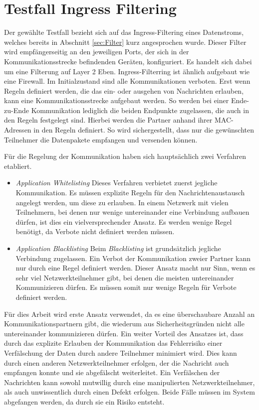\section{Testfall Ingress Filtering}\label{sec:Ingress}
Der gewählte Testfall bezieht sich auf das Ingress-Filtering eines Datenstroms, welches bereits in Abschnitt \ref{sec:Filter} kurz angesprochen wurde. Dieser Filter wird empfängerseitig an den jeweiligen Ports, der sich in der Kommunikationsstrecke befindenden Geräten, konfiguriert. Es handelt sich dabei um eine Filterung auf  Layer 2 Eben. Ingress-Filterring ist ähnlich aufgebaut wie eine Firewall. Im Initialzustand sind alle Kommunikationen verboten. Erst wenn Regeln definiert werden, die das ein- oder ausgehen von Nachrichten erlauben, kann eine Kommunikationsstrecke aufgebaut werden. So werden bei einer Ende-zu-Ende Kommunikation lediglich die beiden Endpunkte zugelassen, die auch in den Regeln festgelegt sind. Hierbei werden die Partner anhand ihrer \ac{MAC}-Adressen in den Regeln definiert. So wird sichergestellt, dass nur die gewünschten Teilnehmer die Datenpakete empfangen und versenden können. 

Für die Regelung der Kommunikation haben sich hauptsächlich zwei Verfahren etabliert. 
\begin{itemize}
	\item \emph{Application Whitelisting}
	\newline Dieses Verfahren verbietet zuerst jegliche Kommunikation. Es müssen explizite Regeln für den Nachrichtenaustausch angelegt werden, um diese zu erlauben. In einem Netzwerk mit vielen Teilnehmern, bei denen nur wenige untereinander eine Verbindung aufbauen dürfen, ist dies ein vielversprechender Ansatz. Es werden wenige Regel benötigt, da Verbote nicht definiert werden müssen.
		
	\item \emph{Application Blacklisting}
	\newline Beim \emph{Blacklisting} ist grundsätzlich jegliche Verbindung zugelassen. Ein Verbot der Kommunikation zweier Partner kann nur durch eine Regel definiert werden. Dieser Ansatz macht nur Sinn, wenn es sehr viel Netzwerkteilnehmer gibt, bei denen die meisten untereinander Kommunizieren dürfen. Es müssen somit nur wenige Regeln für Verbote definiert werden.
\end{itemize}

\newpage

Für dies Arbeit wird erste Ansatz verwendet, da es eine überschaubare Anzahl an Kommunikationspartnern gibt, die wiederum aus Sicherheitsgründen nicht alle untereinander kommunizieren dürfen. Ein weiter Vorteil des Ansatzes ist, dass durch das explizite Erlauben der Kommunikation das Fehlerrisiko einer Verfälschung der Daten durch andere Teilnehmer minimiert wird. Dies kann durch einen anderen Netzwerkteilnehmer erfolgen, der die Nachricht auch empfangen konnte und sie abgefälscht weiterleitet. Ein Verfälschen der Nachrichten kann sowohl mutwillig durch eine manipulierten Netzwerkteilnehmer, als auch unwissentlich durch einen Defekt erfolgen. Beide Fälle müssen im System abgefangen werden, da durch sie ein Risiko entsteht.

